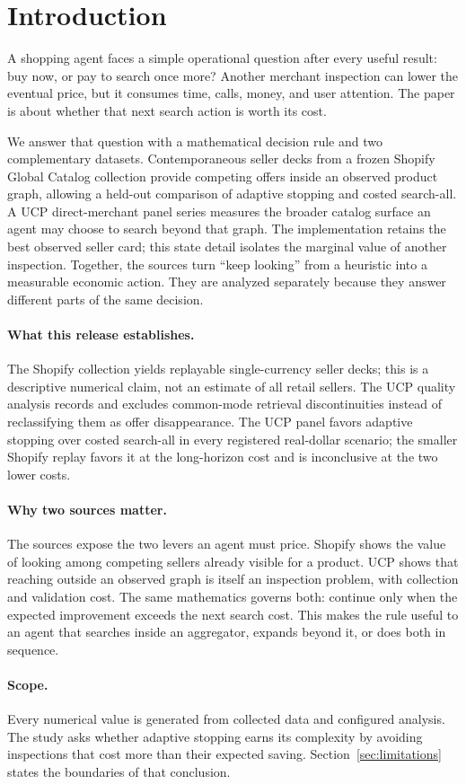 \section{Introduction}
\label{sec:introduction}

A shopping agent faces a simple operational question after every useful result: buy
now, or pay to search once more? Another merchant inspection can lower the eventual
price, but it consumes time, calls, money, and user attention. The paper is about
whether that next search action is worth its cost.

We answer that question with a mathematical decision rule and two complementary
datasets. Contemporaneous seller decks from a frozen Shopify Global Catalog collection
provide competing offers inside an observed product graph, allowing a held-out
comparison of adaptive stopping and costed search-all. A UCP direct-merchant panel series
measures the broader catalog surface an agent may choose to search beyond that graph.
The implementation retains the best observed seller card; this state detail isolates
the marginal value of another inspection. Together, the sources turn ``keep looking''
from a heuristic into a measurable economic action. They are analyzed separately
because they answer different parts of the same decision.

\paragraph{What this release establishes.}
The Shopify collection yields replayable single-currency seller decks; this is a
descriptive numerical claim, not an estimate of all retail sellers.
The UCP quality analysis records and excludes common-mode retrieval discontinuities
instead of reclassifying them as offer disappearance.
The UCP panel favors adaptive stopping over costed search-all in every registered
real-dollar scenario; the smaller Shopify replay favors it at the long-horizon cost
and is inconclusive at the two lower costs.

\paragraph{Why two sources matter.}
The sources expose the two levers an agent must price. Shopify shows the value of
looking among competing sellers already visible for a product. UCP shows that reaching
outside an observed graph is itself an inspection problem, with collection and
validation cost. The same mathematics governs both: continue only when the expected
improvement exceeds the next search cost. This makes the rule useful to an agent that
searches inside an aggregator, expands beyond it, or does both in sequence.

\paragraph{Scope.}
Every numerical value is generated from collected data and configured analysis.
The study asks whether adaptive stopping earns its complexity by avoiding inspections
that cost more than their expected saving. Section~\ref{sec:limitations} states the
boundaries of that conclusion.